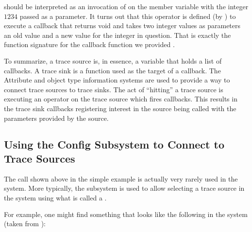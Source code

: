 \documentclass[letterpaper,10pt,english]{sphinxmanual}
\renewcommand{\sphinxcode}[1]{\texttt{\small{#1}}}
\begin{document}
should be interpreted as an invocation of \sphinxcode{} on the member variable
\sphinxcode{} with the integer \(1234\) passed as a parameter. It turns out
that this operator is defined (by \sphinxcode{}) to execute a callback that
returns void and takes two integer values as parameters \textendash{} an old value and a
new value for the integer in question. That is exactly the function signature
for the callback function we provided \textendash{} \sphinxcode{}.

To summarize, a trace source is, in essence, a variable that holds a list of
callbacks. A trace sink is a function used as the target of a callback. The
Attribute and object type information systems are used to provide a way to
connect trace sources to trace sinks. The act of “hitting” a trace source is
executing an operator on the trace source which fires callbacks. This results in
the trace sink callbacks registering interest in the source being called with
the parameters provided by the source.


\subsection{Using the Config Subsystem to Connect to Trace Sources}
\label{\detokenize{tracing:using-the-config-subsystem-to-connect-to-trace-sources}}
The \sphinxcode{} call shown above in the simple example is
actually very rarely used in the system. More typically, the \sphinxcode{}
subsystem is used to allow selecting a trace source in the system using what is
called a .

For example, one might find something that looks like the following in the
system (taken from \sphinxcode{\sphinxupquote{examples/tcp\sphinxhyphen{}large\sphinxhyphen{}transfer.cc}}):

\begin{sphinxVerbatim}[commandchars=\\\{\}]
      


 
   
\end{sphinxVerbatim}
\end{document}
